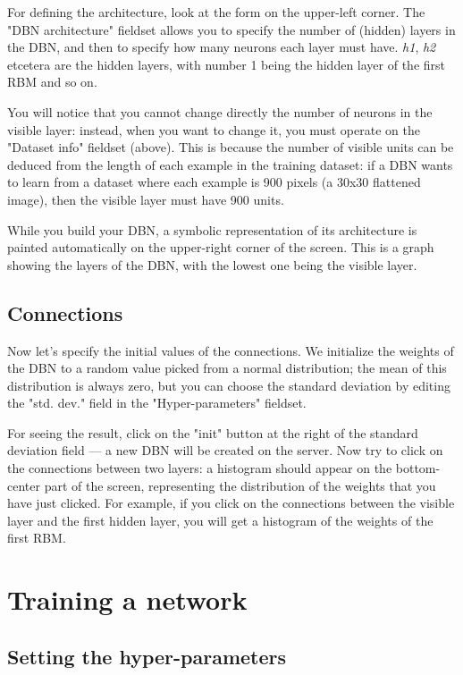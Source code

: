 \documentclass[a4paper]{article}
\begin{document}
		
For defining the architecture, look at the form on the upper-left corner. The "DBN architecture" fieldset allows you to specify the number of (hidden) layers in the DBN, and then to specify how many neurons each layer must have. \emph{h1}, \emph{h2} etcetera are the hidden layers, with number 1 being the hidden layer of the first RBM and so on.
		
You will notice that you cannot change directly the number of neurons in the visible layer: instead, when you want to change it, you must operate on the "Dataset info" fieldset (above). This is because the number of visible units can be deduced from the length of each example in the training dataset: if a DBN wants to learn from a dataset where each example is 900 pixels (a 30x30 flattened image), then the visible layer must have 900 units.
		
While you build your DBN, a symbolic representation of its architecture is painted automatically on the upper-right corner of the screen. This is a graph showing the layers of the DBN, with the lowest one being the visible layer.

		
	\subsection{Connections}

		
Now let's specify the initial values of the connections. We initialize the weights of the DBN to a random value picked from a normal distribution; the mean of this distribution is always zero, but you can choose the standard deviation by editing the "std. dev." field in the "Hyper-parameters" fieldset.
		
For seeing the result, click on the "init" button at the right of the standard deviation field --- a new DBN will be created on the server. Now try to click on the connections between two layers: a histogram should appear on the bottom-center part of the screen, representing the distribution of the weights that you have just clicked. For example, if you click on the connections between the visible layer and the first hidden layer, you will get a histogram of the weights of the first RBM.
	


		
	\section{Training a network}


		
	\subsection{Setting the hyper-parameters}
\end{document}
